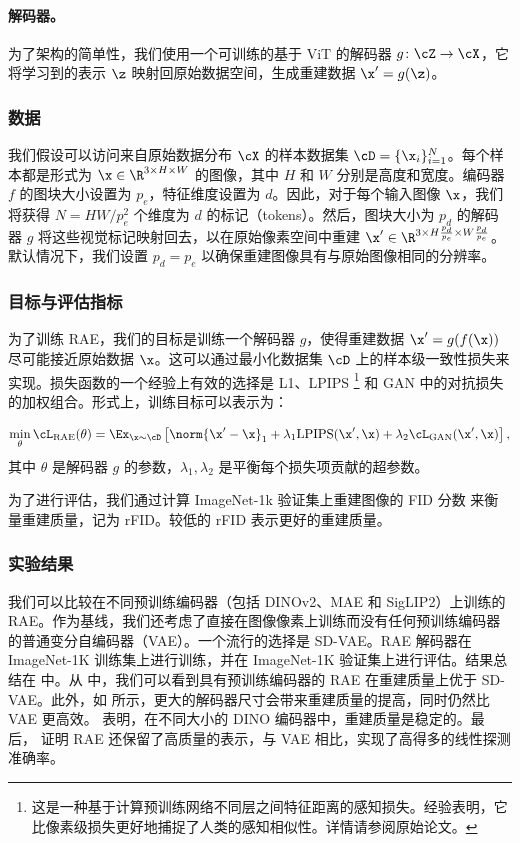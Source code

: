 \documentclass[../../book-main_zh.tex]{subfiles}
\begin{document}
\paragraph{解码器。} 为了架构的简单性，我们使用一个可训练的基于 ViT 的解码器 $g \colon \cZ \to \cX$，它将学习到的表示 $\z$ 映射回原始数据空间，生成重建数据 $\x' = g(\z)$。

\subsubsection{数据}
我们假设可以访问来自原始数据分布 $\cX$ 的样本数据集 $\cD = \{\x_i\}_{i=1}^N$。每个样本都是形式为 $\x \in \R^{3 \times H \times W}$ 的图像，其中 $H$ 和 $W$ 分别是高度和宽度。编码器 $f$ 的图块大小设置为 $p_e$，特征维度设置为 $d$。因此，对于每个输入图像 $\x$，我们将获得 $N = HW/p_e^2$ 个维度为 $d$ 的标记（tokens）。然后，图块大小为 $p_d$ 的解码器 $g$ 将这些视觉标记映射回去，以在原始像素空间中重建 $\x' \in \R^{3 \times H\frac{p_d}{p_e} \times W\frac{p_d}{p_e}}$。默认情况下，我们设置 $p_d = p_e$ 以确保重建图像具有与原始图像相同的分辨率。

\subsubsection{目标与评估指标} 为了训练 RAE，我们的目标是训练一个解码器 $g$，使得重建数据 $\x' = g(f(\x))$ 尽可能接近原始数据 $\x$。这可以通过最小化数据集 $\cD$ 上的样本级一致性损失来实现。损失函数的一个经验上有效的选择是 L1、LPIPS \cite{zhang2018unreasonable} \footnote{这是一种基于计算预训练网络不同层之间特征距离的感知损失。经验表明，它比像素级损失更好地捕捉了人类的感知相似性。详情请参阅原始论文。} 和 GAN \cite{goodfellow2014generative} 中的对抗损失的加权组合。形式上，训练目标可以表示为：

\begin{equation}
\min_{\theta} \cL_{\mathrm{RAE}}(\theta) = \Ex_{\x \sim \cD} \left[
    \norm{\x' - \x}_1 + \lambda_1 \mathrm{LPIPS}(\x', \x) + \lambda_2
\cL_{\mathrm{GAN}}(\x', \x) \right],
\end{equation}
其中 $\theta$ 是解码器 $g$ 的参数，$\lambda_1, \lambda_2$ 是平衡每个损失项贡献的超参数。

为了进行评估，我们通过计算 ImageNet-1k 验证集上重建图像的 FID 分数 \cite{heusel2017gans} 来衡量重建质量，记为 rFID。较低的 rFID 表示更好的重建质量。

\subsubsection{实验结果}
我们可以比较在不同预训练编码器（包括 DINOv2、MAE 和 SigLIP2）上训练的 RAE。作为基线，我们还考虑了直接在图像像素上训练而没有任何预训练编码器的普通变分自编码器（VAE）。一个流行的选择是 SD-VAE。RAE 解码器在 ImageNet-1K 训练集上进行训练，并在 ImageNet-1K 验证集上进行评估。结果总结在  中。从  中，我们可以看到具有预训练编码器的 RAE 在重建质量上优于 SD-VAE。此外，如  所示，更大的解码器尺寸会带来重建质量的提高，同时仍然比 VAE 更高效。 表明，在不同大小的 DINO 编码器中，重建质量是稳定的。最后， 证明 RAE 还保留了高质量的表示，与 VAE 相比，实现了高得多的线性探测准确率。
\end{document}
